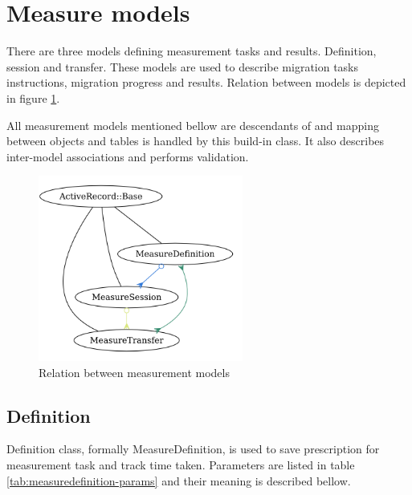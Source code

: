 \section{Measure models}
There are three models defining measurement tasks and results. Definition, session and transfer. These models are used to describe migration tasks instructions, migration progress and results. 
Relation between models is depicted in figure \ref{img:themis-models-brief}.

All measurement models mentioned bellow are descendants of  and mapping between objects and tables is handled by this build-in class. It also describes inter-model associations and performs validation. 

\begin{figure}[htb]
	\begin{center}
	\includegraphics[width=0.6\textwidth]{models_brief.png}
	\end{center}
	\caption{Relation between measurement models}
	\label{img:themis-models-brief}
\end{figure}


\subsection{Definition}
Definition class, formally MeasureDefinition, is used to save prescription for measurement task and track time taken. Parameters are listed in table \ref{tab:measuredefinition-params} and their meaning is described bellow.

